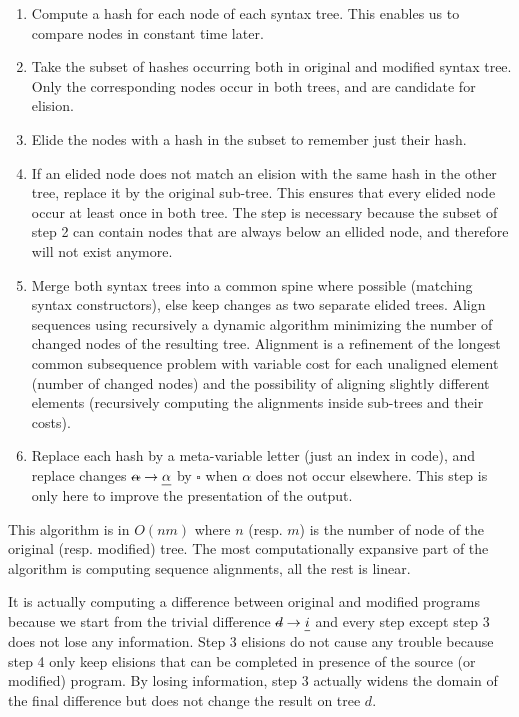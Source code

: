 \documentclass[a4paper,11pt]{article}
\newcommand\mathst[1]{\text{\st{$#1$}}}
\newcommand\mathul[1]{\text{\ul{$#1$}}}
\newcommand\id{\square}
\newcommand\change[2]{\mathst{#1} \rightarrow \mathul{#2}}
\begin{document}
\begin{enumerate}
  \item Compute a hash for each node of each syntax tree. This enables us to compare nodes in constant time later.

  \item Take the subset of hashes occurring both in original and
    modified syntax tree. Only the corresponding nodes occur in both trees, and are candidate for elision.

  \item Elide the nodes with a hash in the subset to remember just
    their hash.

  \item If an elided node does not match an elision with the same hash
    in the other tree, replace it by the original sub-tree. This ensures that every elided node occur at least once in both tree. The step is necessary because the subset of step 2 can contain nodes that are always below an ellided node, and therefore will not exist anymore.

  \item Merge both syntax trees into a common spine where possible (matching syntax constructors), else keep changes as two separate elided trees.
  Align sequences using recursively a dynamic algorithm minimizing the number of changed nodes of the resulting tree.
  Alignment is a refinement of the longest common subsequence problem  with variable cost for each unaligned element (number of changed nodes) and the possibility of aligning slightly different elements (recursively computing the alignments inside sub-trees and their costs).

  \item Replace each hash by a meta-variable letter (just an index in
    code), and replace changes $\change{\alpha}{\alpha}$ by $\id$ when $\alpha$ does not occur elsewhere. This step is only here to improve the presentation of the output.
\end{enumerate}

This algorithm is in $O(nm)$ where $n$ (resp. $m$) is the number of
node of the original (resp. modified) tree. The most computationally
expansive part of the algorithm is computing sequence alignments, all the rest is linear.

It is actually computing a difference between original and modified programs because we start from the trivial difference $\change{d}{i}$ and every step except step 3 does not lose any information. Step 3 elisions do not cause any trouble because step 4 only keep elisions that can be completed in presence of the source (or modified) program. By losing information, step 3 actually widens the domain of the final difference but does not change the result on tree $d$.
\end{document}
